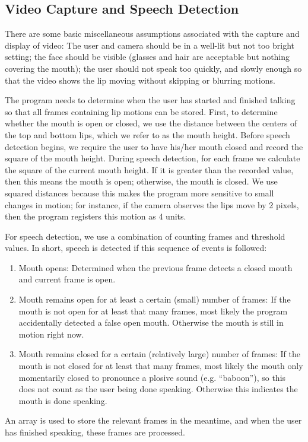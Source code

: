 \documentclass[10pt,twocolumn,letterpaper]{article}
\begin{document}
\subsection{Video Capture and Speech Detection}
There are some basic miscellaneous assumptions associated with the capture and display of video: The user and camera should be in a well-lit but not too bright setting; the face should be visible (glasses and hair are acceptable but nothing covering the mouth); the user should not speak too quickly, and slowly enough so that the video shows the lip moving without skipping or blurring motions.

The program needs to determine when the user has started and finished talking so that all frames containing lip motions can be stored. First, to determine whether the mouth is open or closed, we use the distance between the centers of the top and bottom lips, which we refer to as the mouth height. Before speech detection begins, we require the user to have his/her mouth closed and record the square of the mouth height. During speech detection, for each frame we calculate the square of the current mouth height. If it is greater than the recorded value, then this means the mouth is open; otherwise, the mouth is closed. We use squared distances because this makes the program more sensitive to small changes in motion; for instance, if the camera observes the lips move by 2 pixels, then the program registers this motion as 4 units.

For speech detection, we use a combination of counting frames and threshold values. In short, speech is detected if this sequence of events is followed:
\begin{enumerate}
\item Mouth opens: Determined when the previous frame detects a closed mouth and current frame is open.
\item Mouth remains open for at least a certain (small) number of frames: If the mouth is not open for at least that many frames, most likely the program accidentally detected a false open mouth. Otherwise the mouth is still in motion right now.
\item Mouth remains closed for a certain (relatively large) number of frames: If the mouth is not closed for at least that many frames, most likely the mouth only momentarily closed to pronounce a plosive sound (e.g. “baboon”), so this does not count as the user being done speaking. Otherwise this indicates the mouth is done speaking.
\end{enumerate}
An array is used to store the relevant frames in the meantime, and when the user has finished speaking, these frames are processed.
\end{document}
